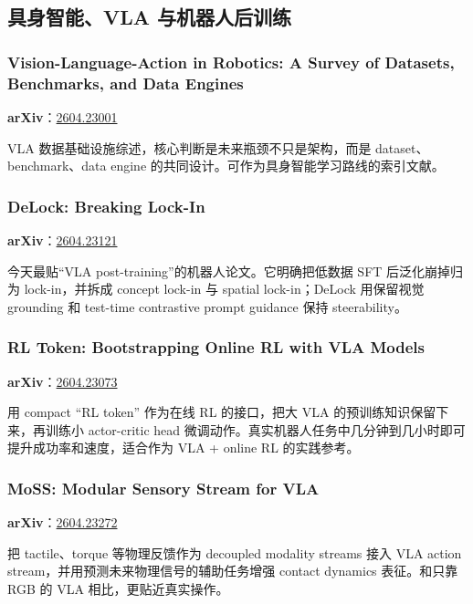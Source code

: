 \subsection{具身智能、VLA 与机器人后训练}

\subsubsection{Vision-Language-Action in Robotics: A Survey of Datasets, Benchmarks, and Data Engines}

\textbf{arXiv}：\href{https://arxiv.org/abs/2604.23001}{2604.23001}

VLA 数据基础设施综述，核心判断是未来瓶颈不只是架构，而是 dataset、benchmark、data engine 的共同设计。可作为具身智能学习路线的索引文献。

\subsubsection{DeLock: Breaking Lock-In}

\textbf{arXiv}：\href{https://arxiv.org/abs/2604.23121}{2604.23121}

今天最贴“VLA post-training”的机器人论文。它明确把低数据 SFT 后泛化崩掉归为 lock-in，并拆成 concept lock-in 与 spatial lock-in；DeLock 用保留视觉 grounding 和 test-time contrastive prompt guidance 保持 steerability。

\subsubsection{RL Token: Bootstrapping Online RL with VLA Models}

\textbf{arXiv}：\href{https://arxiv.org/abs/2604.23073}{2604.23073}

用 compact ``RL token'' 作为在线 RL 的接口，把大 VLA 的预训练知识保留下来，再训练小 actor-critic head 微调动作。真实机器人任务中几分钟到几小时即可提升成功率和速度，适合作为 VLA + online RL 的实践参考。

\subsubsection{MoSS: Modular Sensory Stream for VLA}

\textbf{arXiv}：\href{https://arxiv.org/abs/2604.23272}{2604.23272}

把 tactile、torque 等物理反馈作为 decoupled modality streams 接入 VLA action stream，并用预测未来物理信号的辅助任务增强 contact dynamics 表征。和只靠 RGB 的 VLA 相比，更贴近真实操作。

